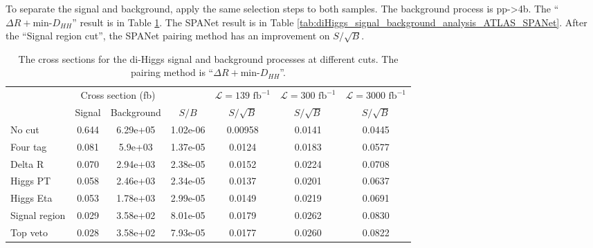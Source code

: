 \documentclass[12pt]{article}
\begin{document}
			To separate the signal and background, apply the same selection steps to both samples. The background process is pp->4b. The ``$\Delta R + \text{min-}D_{HH}$'' result is in Table \ref{tab:diHiggs_signal_background_analysis_ATLAS_minDHH}. The SPANet result is in Table \ref{tab:diHiggs_signal_background_analysis_ATLAS_SPANet}. After the ``Signal region cut'', the SPANet pairing method has an improvement on $S/\sqrt{B}$.
			\begin{table}[htpb]
				\centering
				\caption{The cross sections for the di-Higgs signal and background processes at different cuts. The pairing method is ``$\Delta R + \text{min-}D_{HH}$''.}
				\label{tab:diHiggs_signal_background_analysis_ATLAS_minDHH}
				\begin{tabular}{l|cc|c|c|c|c}
								  & \multicolumn{2}{c|}{Cross section (fb)} &          & $\mathcal{L} = 139 \text{ fb}^{-1}$ & $\mathcal{L} = 300 \text{ fb}^{-1}$ & $\mathcal{L} = 3000 \text{ fb}^{-1}$ \\
								  & Signal           & Background           & $S / B$  & $S/\sqrt{B}$                        & $S/\sqrt{B}$                        & $S/\sqrt{B}$                         \\ \hline
					No cut        & 0.644            & 6.29e+05             & 1.02e-06 & 0.00958                             & 0.0141                              & 0.0445                               \\
					Four tag      & 0.081            & 5.9e+03              & 1.37e-05 & 0.0124                              & 0.0183                              & 0.0577                               \\
					Delta R       & 0.070            & 2.94e+03             & 2.38e-05 & 0.0152                              & 0.0224                              & 0.0708                               \\
					Higgs PT & 0.058            & 2.46e+03             & 2.34e-05 & 0.0137                              & 0.0201                              & 0.0637                               \\
					Higgs Eta & 0.053            & 1.78e+03             & 2.99e-05 & 0.0149                              & 0.0219                              & 0.0691                               \\
					Signal region  & 0.029            & 3.58e+02             & 8.01e-05 & 0.0179                              & 0.0262                              & 0.0830                               \\
					Top veto      & 0.028            & 3.58e+02             & 7.93e-05 & 0.0177                              & 0.0260                              & 0.0822                              
				\end{tabular}
			\end{table}
\end{document}
